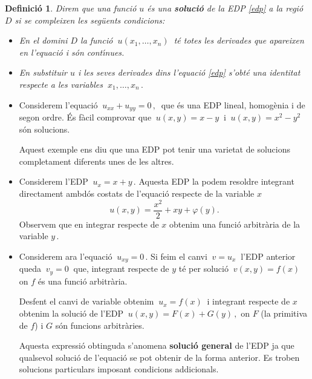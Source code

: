 \documentclass[12pt]{article}
\newtheorem{definicio}{Definici{\'o}}[subsection]
\begin{document}
\vspace{0.4cm}
\begin{definicio}
Direm que una funci{\'o} $u$  {\'e}s una \textbf{soluci{\'o}}  de la EDP \eqref{edp} a la regi{\'o} $D$ si se compleixen les seg{\"u}ents condicions:
\begin{itemize}
\item En el domini $D$ la funci{\'o} $\ u(x_1,\ldots,x_n)\ $ t{\'e} totes les derivades que apareixen en l'equaci{\'o} i s{\'o}n cont{\'\i}nues.
\item En substituir $u$  i les seves derivades dins l'equaci{\'o} \eqref{edp} s'obt{\'e} una identitat respecte a les variables $\ x_1,\ldots,x_n\,.$
 \end{itemize}
\end{definicio}

\newpage
\vspace{0.4cm}
\begin{exemples}
\begin{itemize}
\item Considerem l'equaci{\'o} $\ u_{xx} + u_{yy} = 0\,,\ $ que {\'e}s una EDP lineal, homog{\`e}nia i de segon ordre.
{\'E}s f{\`a}cil comprovar que $\ u(x,y)=x-y\ $ i $\ u(x,y) =x^2-y^2\ $ s{\'o}n solucions.

Aquest exemple ens diu que una EDP pot tenir una varietat de solucions completament diferents unes de les altres.

\item Considerem l'EDP $\ u_x=x+y\,.$ Aquesta EDP la podem resoldre integrant directament ambd{\'o}s costats
de l'equaci{\'o} respecte de la variable $x$
\[
 u(x,y)=\frac{x^2}{2}+xy+\varphi(y).
\]
Observem que en integrar respecte de $x$ obtenim una funci{\'o} arbitr{\`a}ria de la variable $y\,.$

\item Considerem ara l'equaci{\'o} $\ u_{xy} = 0\,.$ Si feim el canvi $\ v = u_x\ $ l'EDP anterior queda $\ v_y=0\ $ que, integrant respecte de $y$ t{\'e} per soluci{\'o} $\ v(x,y) = f(x)\ $ on $f$ {\'e}s una funci{\'o} arbitr{\`a}ria.

Desfent el canvi de variable obtenim $\ u_x = f(x)\ $ i integrant respecte de $x$ obtenim la soluci{\'o} de l'EDP
$\ u(x, y) = F(x) + G(y)\,,$ on $F$ (la primitiva de $f$) i $G$ s{\'o}n funcions
arbitr{\`a}ries.

Aquesta expressi{\'o} obtinguda s'anomena \textbf{soluci{\'o} general} de l'EDP ja que qualsevol soluci{\'o}
de l'equaci{\'o} se pot obtenir de la forma anterior. Es troben solucions particulars imposant condicions addicionals.
\end{itemize}
\end{exemples}
\end{document}
